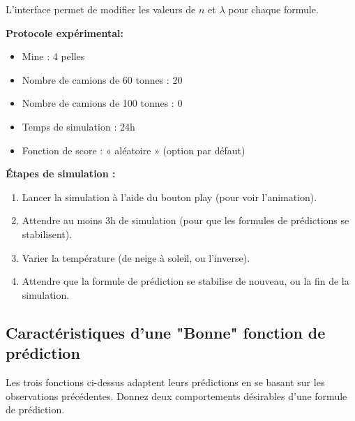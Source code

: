 	L'interface permet de modifier les valeurs de $n$ et $\lambda$ pour chaque formule.
	
	\vspace{10pt}
	\noindent \textbf{\Large Protocole expérimental: }
	
	\begin{itemize}
		\item Mine : 4 pelles
		\item Nombre de camions de 60 tonnes : 20
		\item Nombre de camions de 100 tonnes : 0
		\item Temps de simulation : 24h
		\item Fonction de score : « aléatoire » (option par défaut)
	\end{itemize}
	
	\vspace{10pt}
	\noindent \textbf{\large Étapes de simulation :  }
	
	\begin{enumerate}
		\item Lancer la simulation à l’aide du bouton play (pour voir l’animation).
		\item Attendre au moins 3h de simulation (pour que les formules de prédictions se stabilisent).
		\item Varier la température (de neige à soleil, ou l’inverse).
		\item Attendre que la formule de prédiction se stabilise de nouveau, ou la fin de la simulation.
	\end{enumerate}
	
	
	
	\subsection{Caractéristiques d'une "Bonne" fonction de prédiction }

 	Les trois fonctions ci-dessus adaptent leurs prédictions en se basant sur les observations précédentes. Donnez deux comportements désirables d'une formule de prédiction.

	
